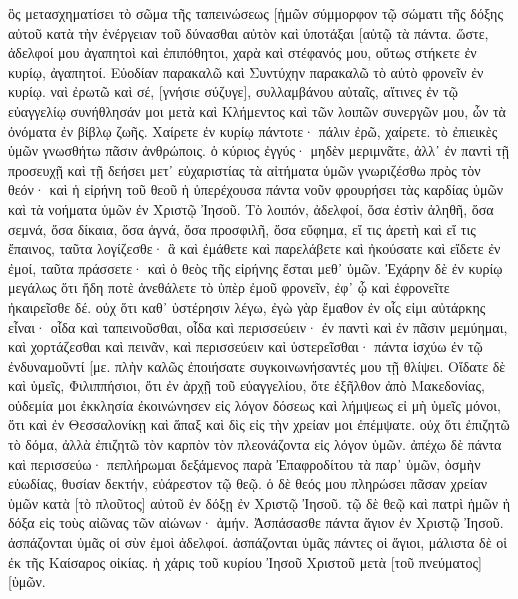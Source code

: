 ὃς μετασχηματίσει τὸ σῶμα τῆς ταπεινώσεως [ἡμῶν σύμμορφον τῷ σώματι τῆς δόξης αὐτοῦ κατὰ τὴν ἐνέργειαν τοῦ δύνασθαι αὐτὸν καὶ ὑποτάξαι [αὑτῷ τὰ πάντα. 
ὥστε, ἀδελφοί μου ἀγαπητοὶ καὶ ἐπιπόθητοι, χαρὰ καὶ στέφανός μου, οὕτως στήκετε ἐν κυρίῳ, ἀγαπητοί. 
Εὐοδίαν παρακαλῶ καὶ Συντύχην παρακαλῶ τὸ αὐτὸ φρονεῖν ἐν κυρίῳ. 
ναὶ ἐρωτῶ καὶ σέ, [γνήσιε σύζυγε], συλλαμβάνου αὐταῖς, αἵτινες ἐν τῷ εὐαγγελίῳ συνήθλησάν μοι μετὰ καὶ Κλήμεντος καὶ τῶν λοιπῶν συνεργῶν μου, ὧν τὰ ὀνόματα ἐν βίβλῳ ζωῆς. 
Χαίρετε ἐν κυρίῳ πάντοτε· πάλιν ἐρῶ, χαίρετε. 
τὸ ἐπιεικὲς ὑμῶν γνωσθήτω πᾶσιν ἀνθρώποις. ὁ κύριος ἐγγύς· 
μηδὲν μεριμνᾶτε, ἀλλ᾽ ἐν παντὶ τῇ προσευχῇ καὶ τῇ δεήσει μετ᾽ εὐχαριστίας τὰ αἰτήματα ὑμῶν γνωριζέσθω πρὸς τὸν θεόν· 
καὶ ἡ εἰρήνη τοῦ θεοῦ ἡ ὑπερέχουσα πάντα νοῦν φρουρήσει τὰς καρδίας ὑμῶν καὶ τὰ νοήματα ὑμῶν ἐν Χριστῷ Ἰησοῦ. 
Τὸ λοιπόν, ἀδελφοί, ὅσα ἐστὶν ἀληθῆ, ὅσα σεμνά, ὅσα δίκαια, ὅσα ἁγνά, ὅσα προσφιλῆ, ὅσα εὔφημα, εἴ τις ἀρετὴ καὶ εἴ τις ἔπαινος, ταῦτα λογίζεσθε· 
ἃ καὶ ἐμάθετε καὶ παρελάβετε καὶ ἠκούσατε καὶ εἴδετε ἐν ἐμοί, ταῦτα πράσσετε· καὶ ὁ θεὸς τῆς εἰρήνης ἔσται μεθ᾽ ὑμῶν. 
Ἐχάρην δὲ ἐν κυρίῳ μεγάλως ὅτι ἤδη ποτὲ ἀνεθάλετε τὸ ὑπὲρ ἐμοῦ φρονεῖν, ἐφ᾽ ᾧ καὶ ἐφρονεῖτε ἠκαιρεῖσθε δέ. 
οὐχ ὅτι καθ᾽ ὑστέρησιν λέγω, ἐγὼ γὰρ ἔμαθον ἐν οἷς εἰμι αὐτάρκης εἶναι· 
οἶδα καὶ ταπεινοῦσθαι, οἶδα καὶ περισσεύειν· ἐν παντὶ καὶ ἐν πᾶσιν μεμύημαι, καὶ χορτάζεσθαι καὶ πεινᾶν, καὶ περισσεύειν καὶ ὑστερεῖσθαι· 
πάντα ἰσχύω ἐν τῷ ἐνδυναμοῦντί [με. 
πλὴν καλῶς ἐποιήσατε συγκοινωνήσαντές μου τῇ θλίψει. 
Οἴδατε δὲ καὶ ὑμεῖς, Φιλιππήσιοι, ὅτι ἐν ἀρχῇ τοῦ εὐαγγελίου, ὅτε ἐξῆλθον ἀπὸ Μακεδονίας, οὐδεμία μοι ἐκκλησία ἐκοινώνησεν εἰς λόγον δόσεως καὶ λήμψεως εἰ μὴ ὑμεῖς μόνοι, 
ὅτι καὶ ἐν Θεσσαλονίκῃ καὶ ἅπαξ καὶ δὶς εἰς τὴν χρείαν μοι ἐπέμψατε. 
οὐχ ὅτι ἐπιζητῶ τὸ δόμα, ἀλλὰ ἐπιζητῶ τὸν καρπὸν τὸν πλεονάζοντα εἰς λόγον ὑμῶν. 
ἀπέχω δὲ πάντα καὶ περισσεύω· πεπλήρωμαι δεξάμενος παρὰ Ἐπαφροδίτου τὰ παρ᾽ ὑμῶν, ὀσμὴν εὐωδίας, θυσίαν δεκτήν, εὐάρεστον τῷ θεῷ. 
ὁ δὲ θεός μου πληρώσει πᾶσαν χρείαν ὑμῶν κατὰ [τὸ πλοῦτος] αὐτοῦ ἐν δόξῃ ἐν Χριστῷ Ἰησοῦ. 
τῷ δὲ θεῷ καὶ πατρὶ ἡμῶν ἡ δόξα εἰς τοὺς αἰῶνας τῶν αἰώνων· ἀμήν. 
Ἀσπάσασθε πάντα ἅγιον ἐν Χριστῷ Ἰησοῦ. ἀσπάζονται ὑμᾶς οἱ σὺν ἐμοὶ ἀδελφοί. 
ἀσπάζονται ὑμᾶς πάντες οἱ ἅγιοι, μάλιστα δὲ οἱ ἐκ τῆς Καίσαρος οἰκίας. 
ἡ χάρις τοῦ κυρίου Ἰησοῦ Χριστοῦ μετὰ [τοῦ πνεύματος] [ὑμῶν. 
